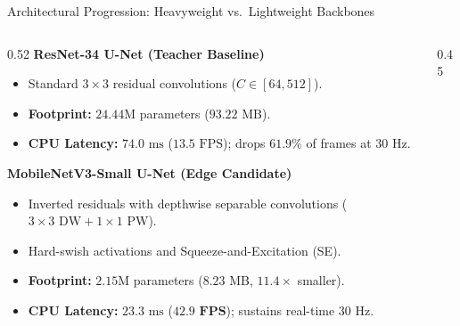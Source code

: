 \documentclass[aspectratio=169, 10pt]{beamer}
\begin{document}
\begin{frame}{Architectural Progression: Heavyweight vs.\ Lightweight Backbones}
\begin{columns}[T, onlytextwidth]
  \begin{column}{0.52\textwidth}
    \textbf{ResNet-34 U-Net (Teacher Baseline)}
    \begin{itemize}\setlength{\itemsep}{3pt}\footnotesize
      \item Standard $3\times3$ residual convolutions ($C \in [64, 512]$).
      \item \textbf{Footprint:} $24.44\text{M}$ parameters ($93.22\text{ MB}$).
      \item \textbf{CPU Latency:} $74.0\text{ ms}$ ($13.5\text{ FPS}$); drops $61.9\%$ of frames at $30\text{ Hz}$.
    \end{itemize}

    \vspace{0.6em}

    \textbf{MobileNetV3-Small U-Net (Edge Candidate)}
    \begin{itemize}\setlength{\itemsep}{3pt}\footnotesize
      \item Inverted residuals with depthwise separable convolutions ($3\times3\text{ DW} + 1\times1\text{ PW}$).
      \item Hard-swish activations and Squeeze-and-Excitation (SE).
      \item \textbf{Footprint:} $2.15\text{M}$ parameters ($8.23\text{ MB}$, $11.4\times$ smaller).
      \item \textbf{CPU Latency:} $23.3\text{ ms}$ ($\mathbf{42.9\text{ FPS}}$); sustains real-time $30\text{ Hz}$.
    \end{itemize}
  \end{column}

  \begin{column}{0.45\textwidth}
  

\end{column}
\end{columns}
\end{frame}
\end{document}
